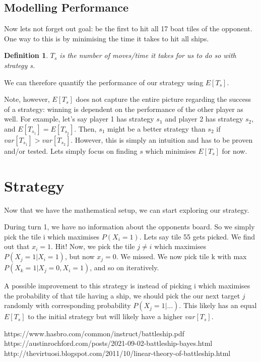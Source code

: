 \documentclass[11pt]{article}
\newtheorem{definition}{Definition}
\begin{document}
\subsection{Modelling Performance}
Now lets not forget out goal: be the first to hit all 17 boat tiles of the opponent. One way to this is by minimising the time it takes to hit all ships.


\begin{definition}
 $T_s$ is the number of moves/time it takes for us to do so with strategy s.
\end{definition}

We can therefore quantify the performance of our strategy using $E[T_s]$.

Note, however, $E[T_s]$ does not capture the entire picture regarding the success of a strategy: winning is dependent on the performance of the other player as well. For example, let's say player 1 has strategy $s_1$ and player 2 has strategy $s_2$, and $E[T_{s_1}] = E[T_{s_2}]$. Then, $s_1$ might be a better strategy than $s_2$ if $var[T_{s_1}] > var[T_{s_2}]$. However, this is simply an intuition and has to be proven and/or tested. Lets simply focus on finding $s$ which minimises $E[T_s]$ for now. 

\section{Strategy}
Now that we have the mathematical setup, we can start exploring our strategy. 

During turn 1, we have no information about the opponents board. So we simply pick the tile i which maximises $P(X_i = 1)$. Lets say tile 55 gets picked. We find out that $x_i = 1$. Hit! Now, we pick the tile $ j \neq i$ which maximises $P(X_j = 1 | X_i = 1)$, but now $x_j = 0$. We missed. We now pick tile k with max $P(X_k = 1 | X_j = 0, X_i = 1)$, and so on iteratively. 

A possible improvement to this strategy is instead of picking i which maximises the probability of that tile having a ship, we should pick the our next target $j$ randomly with corresponding probability $P(X_j = 1 | ...)$. This likely has an equal $E[T_s]$ to the initial strategy but will likely have a higher $var[T_s]$.


\begin{thebibliography}{11}
 https://www.hasbro.com/common/instruct/battleship.pdf
 https://austinrochford.com/posts/2021-09-02-battleship-bayes.html
 http://thevirtuosi.blogspot.com/2011/10/linear-theory-of-battleship.html
\end{thebibliography}
\end{document}
